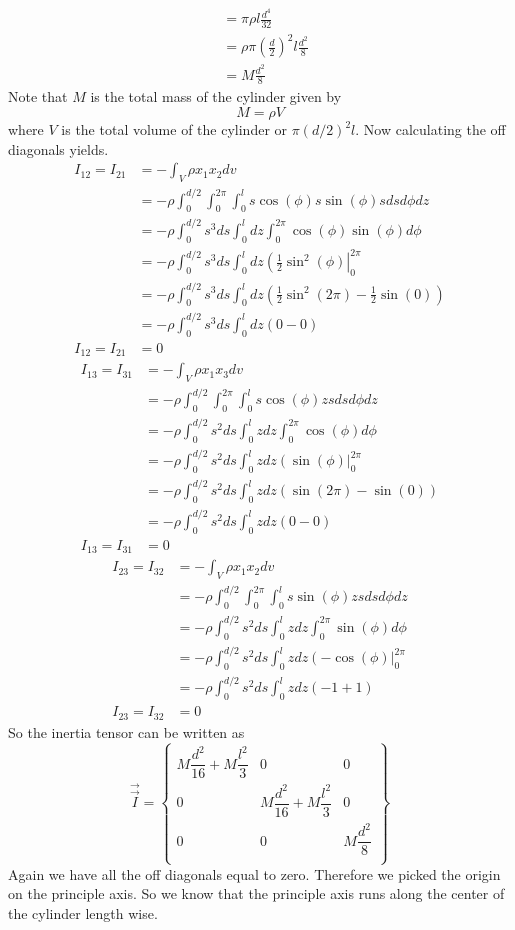 \documentclass[11pt]{article}
\numberwithin{equation}{section}
\begin{document}
\begin{enumerate}[(a)]
\begin{align*}
&= \pi\rho l\frac{d^4}{32}\\
&= \rho\pi\left(\frac{d}{2}\right)^2 l\frac{d^2}{8}\\
&= M\frac{d^2}{8}
\end{align*}
Note that $M$ is the total mass of the cylinder given by 
$$M = \rho V$$
where $V$ is the total volume of the cylinder or $\pi (d/2)^2 l$. Now calculating the off diagonals yields.
\begin{align*}
I_{12} = I_{21} &= -\int_V\rho x_1x_2dv\\
&= -\rho\int_0^{d/2}\int_0^{2\pi}\int_0^l s\cos(\phi)s\sin(\phi) sdsd\phi dz\\
&= -\rho\int_0^{d/2}s^3ds\int_0^ldz\int_0^{2\pi}\cos(\phi)\sin(\phi)d\phi \\
&= -\rho\int_0^{d/2}s^3ds\int_0^ldz\left(\frac{1}{2}\sin^2(\phi)\right|_0^{2\pi} \\
&= -\rho\int_0^{d/2}s^3ds\int_0^ldz\left(\frac{1}{2}\sin^2(2\pi)-\frac{1}{2}\sin(0)\right) \\
&= -\rho\int_0^{d/2}s^3ds\int_0^ldz\left(0-0\right) \\
I_{12} = I_{21} &= 0
\end{align*}
\begin{align*}
I_{13} = I_{31} &= -\int_V\rho x_1x_3dv\\
&= -\rho\int_0^{d/2}\int_0^{2\pi}\int_0^l s\cos(\phi)z sdsd\phi dz\\
&= -\rho\int_0^{d/2}s^2ds\int_0^lzdz \int_0^{2\pi}\cos(\phi) d\phi \\
&= -\rho\int_0^{d/2}s^2ds\int_0^lzdz\left(\sin(\phi)\right|_0^{2\pi} \\
&= -\rho\int_0^{d/2}s^2ds\int_0^lzdz\left(\sin(2\pi)-\sin(0)\right) \\
&= -\rho\int_0^{d/2}s^2ds\int_0^lzdz\left(0-0\right) \\
I_{13} = I_{31} &= 0
\end{align*}
\begin{align*}
I_{23} = I_{32} &= -\int_V\rho x_1x_2dv\\
&= -\rho\int_0^{d/2}\int_0^{2\pi}\int_0^l s\sin(\phi)z sdsd\phi dz\\
&= -\rho\int_0^{d/2}s^2ds\int_0^lzdz \int_0^{2\pi}\sin(\phi) d\phi \\
&= -\rho\int_0^{d/2}s^2ds\int_0^lzdz\left(-\cos(\phi)\right|_0^{2\pi} \\
&= -\rho\int_0^{d/2}s^2ds\int_0^lzdz\left(-1+1\right) \\
I_{23} = I_{32} &= 0
\end{align*}
So the inertia tensor can be written as
$$\vec{\vec{I}} = \left\{\begin{array}{ccc}
	M\dfrac{d^2}{16}+M\dfrac{l^2}{3}	&0		&0\\
	0		&M\dfrac{d^2}{16}+M\dfrac{l^2}{3}	&0\\
	0				&0		&M\dfrac{d^2}{8}\\
			\end{array}\right\}$$
Again we have all the off diagonals equal to zero. Therefore we picked the origin on the principle axis. So we know that the principle axis runs along the center of the cylinder length wise.
\end{enumerate}
\end{document}
